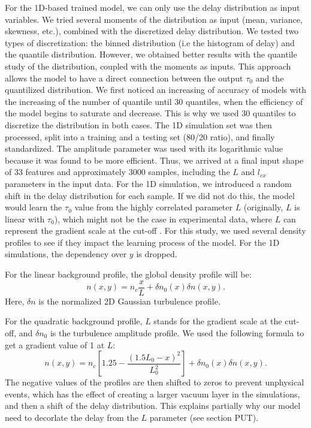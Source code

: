 \documentclass[11pt,a4paper,openany]{report}
\begin{document}
\begin{multicols}{2}
    For the 1D-based trained model, we can only use the delay distribution as input variables. We tried several moments of the distribution as input (mean, variance, skewness, etc.), combined with the discretized delay distribution. We tested two types of discretization: the binned distribution (i.e the histogram of delay) and the quantile distribution. However, we obtained better results with the quantile study of the distribution, coupled with the moments as inputs. This approach allows the model to have a direct connection between the output $\tau_0$ and the quantilized distribution. We first noticed an increasing of accuracy of models with the increasing of the number of quantile until 30 quantiles, when the efficiency of the model begins to saturate and decrease. This is why we used 30 quantiles to discretize the distribution in both cases. The 1D simulation set was then processed, split into a training and a testing set (80/20 ratio), and finally standardized. The amplitude parameter was used with its logarithmic value because it was found to be more efficient. Thus, we arrived at a final input shape of 33 features and approximately 3000 samples, including the $L$ and $l_{cx}$ parameters in the input data. For the 1D simulation, we introduced a random shift in the delay distribution for each sample. If we did not do this, the model would learn the $\tau_0$ value from the highly correlated parameter $L$ (originally, $L$ is linear with $\tau_0$), which might not be the case in experimental data, where $L$ can represent the gradient scale at the cut-off \cite{Krutkin_thesis}. For this study, we used several density profiles to see if they impact the learning process of the model. For the 1D simulations, the dependency over $y$ is dropped.

    For the linear background profile, the global density profile will be:
    $$n(x,y) = n_c \frac{x}{L} + \delta n_0(x) \delta n(x,y).$$
    Here, $\delta n$ is the normalized 2D Gaussian turbulence profile.

    For the quadratic background profile, $L$ stands for the gradient scale at the cut-off, and $\delta n_0$ is the turbulence amplitude profile. We used the following formula to get a gradient value of 1 at $L$:
    $$n(x,y) = n_c \left[1.25 - \frac{(1.5L_0 - x)^2}{L_0^2} \right] + \delta n_0(x) \delta n(x,y).$$
    The negative values of the profiles are then shifted to zeros to prevent unphysical events, which has the effect of creating a larger vacuum layer in the simulations, and then a shift of the delay distribution. This explains partially why our model need to decorlate the delay from the $L$ parameter (see section PUT).


\end{multicols}
\end{document}
